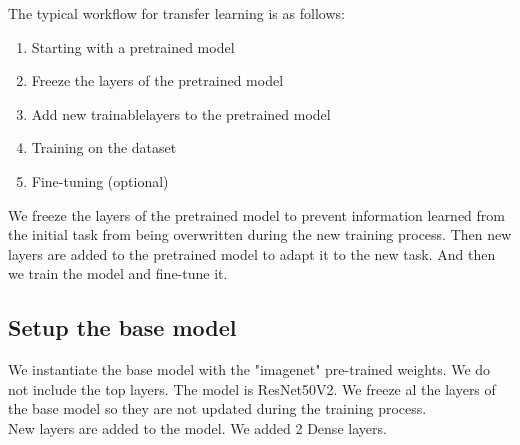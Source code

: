 \documentclass[conference]{IEEEtran}
\begin{document}
The typical workflow for transfer learning is as follows:
\begin{enumerate}
	\item Starting with a pretrained model
	\item Freeze the layers of the pretrained model
	\item Add new trainablelayers to the pretrained model
	\item Training on the dataset
	\item Fine-tuning (optional)
\end{enumerate}

We freeze the layers of the pretrained model to prevent information learned from the initial task from being overwritten during the new training process. Then new layers are added to the pretrained model to adapt it to the new task. And then we train the model and fine-tune it.\\

\subsection{Setup the base model}
We instantiate the base model with the "imagenet" pre-trained weights. We do not include the top layers. The model is ResNet50V2. We freeze al the layers of the base model so they are not updated during the training process.\\

New layers are added to the model. We added 2 Dense layers.\\
\end{document}
